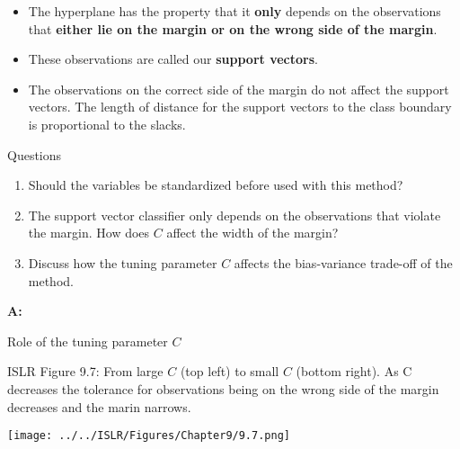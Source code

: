 \documentclass[10pt,ignorenonframetext,]{beamer}
\begin{document}
\begin{frame}

\begin{itemize}
\item
  The hyperplane has the property that it \textbf{only} depends on the
  observations that \textbf{either lie on the margin or on the wrong
  side of the margin}.
\item
  These observations are called our \textbf{support vectors}.
\item
  The observations on the correct side of the margin do not affect the
  support vectors. The length of distance for the support vectors to the
  class boundary is proportional to the slacks.
\end{itemize}

\end{frame}

\begin{frame}

\begin{block}{Questions}

\vspace{2mm}

\begin{enumerate}
\item
  Should the variables be standardized before used with this method?
\item
  The support vector classifier only depends on the observations that
  violate the margin. How does \(C\) affect the width of the margin?
\item
  Discuss how the tuning parameter \(C\) affects the bias-variance
  trade-off of the method.
\end{enumerate}

\end{block}

\end{frame}

\begin{frame}

\textbf{A:}

\end{frame}

\begin{frame}

\begin{block}{Role of the tuning parameter \(C\)}

ISLR Figure 9.7: From large \(C\) (top left) to small \(C\) (bottom
right). As C decreases the tolerance for observations being on the wrong
side of the margin decreases and the marin narrows.

\centering

\texttt{[image: ../../ISLR/Figures/Chapter9/9.7.png]}

\end{block}

\end{frame}
\end{document}
